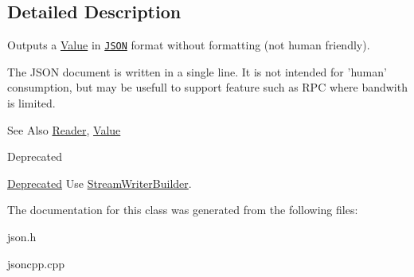 \subsection{Detailed Description}
Outputs a \hyperlink{class_json_1_1_value}{Value} in \href{http://www.json.org}{\tt J\-S\-O\-N} format without formatting (not human friendly). 

The J\-S\-O\-N document is written in a single line. It is not intended for 'human' consumption, but may be usefull to support feature such as R\-P\-C where bandwith is limited. \begin{DoxySeeAlso}{See Also}
\hyperlink{class_json_1_1_reader}{Reader}, \hyperlink{class_json_1_1_value}{Value} 
\end{DoxySeeAlso}
\begin{DoxyRefDesc}{Deprecated}
\item[\hyperlink{deprecated__deprecated000008}{Deprecated}]Use \hyperlink{class_json_1_1_stream_writer_builder}{Stream\-Writer\-Builder}. \end{DoxyRefDesc}


The documentation for this class was generated from the following files\-:\begin{DoxyCompactItemize}
\item 
json.\-h\item 
jsoncpp.\-cpp\end{DoxyCompactItemize}
